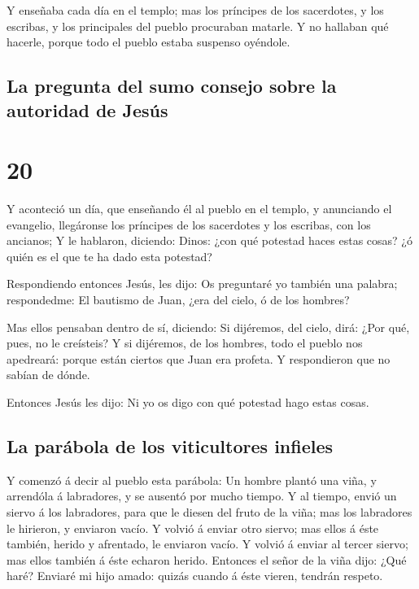  Y enseñaba cada día en el templo; mas los príncipes de
los sacerdotes, y los escribas, y los principales del pueblo procuraban
matarle.  Y no hallaban qué hacerle, porque todo el
pueblo estaba suspenso oyéndole.

\hypertarget{la-pregunta-del-sumo-consejo-sobre-la-autoridad-de-jesuxfas}{%
\subsection{La pregunta del sumo consejo sobre la autoridad de
Jesús}\label{la-pregunta-del-sumo-consejo-sobre-la-autoridad-de-jesuxfas}}

\hypertarget{section-42-20}{%
\section{20}\label{section-42-20}}

 Y aconteció un día, que enseñando él al pueblo en el
templo, y anunciando el evangelio, llegáronse los príncipes de los
sacerdotes y los escribas, con los ancianos;  Y le
hablaron, diciendo: Dinos: ¿con qué potestad haces estas cosas? ¿ó quién
es el que te ha dado esta potestad?

 Respondiendo entonces Jesús, les dijo: Os preguntaré yo
también una palabra; respondedme:  El bautismo de Juan,
¿era del cielo, ó de los hombres?

 Mas ellos pensaban dentro de sí, diciendo: Si dijéremos,
del cielo, dirá: ¿Por qué, pues, no le creísteis?  Y si
dijéremos, de los hombres, todo el pueblo nos apedreará: porque están
ciertos que Juan era profeta.  Y respondieron que no
sabían de dónde.

 Entonces Jesús les dijo: Ni yo os digo con qué potestad
hago estas cosas.

\hypertarget{la-paruxe1bola-de-los-viticultores-infieles}{%
\subsection{La parábola de los viticultores
infieles}\label{la-paruxe1bola-de-los-viticultores-infieles}}

 Y comenzó á decir al pueblo esta parábola: Un hombre
plantó una viña, y arrendóla á labradores, y se ausentó por mucho
tiempo.  Y al tiempo, envió un siervo á los labradores,
para que le diesen del fruto de la viña; mas los labradores le hirieron,
y enviaron vacío.  Y volvió á enviar otro siervo; mas
ellos á éste también, herido y afrentado, le enviaron vacío.
 Y volvió á enviar al tercer siervo; mas ellos también á
éste echaron herido.  Entonces el señor de la viña dijo:
¿Qué haré? Enviaré mi hijo amado: quizás cuando á éste vieren, tendrán
respeto.

